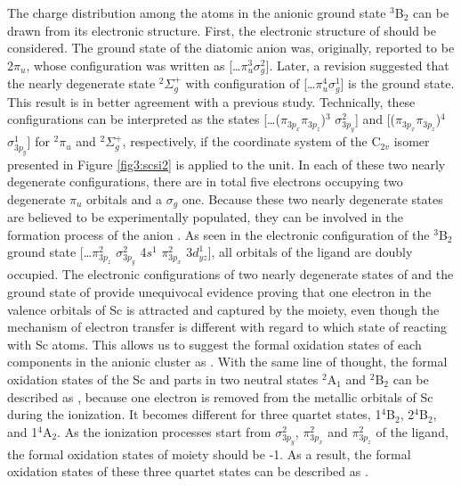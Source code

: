 \begin{refsection}
The charge distribution among the atoms in the anionic ground state $^3$B$_2$ can be drawn from its electronic structure. First, the electronic structure of  should be considered. The ground state of the diatomic anion  was, originally, reported to be 2$\pi_u$, whose configuration was written as [\ldots $\pi^3_u\sigma^2_g$].\cite{c3:47} Later, a revision suggested that the nearly degenerate state $^2\Sigma_g^+$ with configuration of [\ldots $\pi^4_u\sigma^1_g$] is the ground state.\cite{c3:48}  This result is in better agreement with a previous study.\cite{c3:49} Technically, these configurations can be interpreted as the states [\ldots ($\pi_{3p_x}\pi_{3p_z}$)$^3$ $\sigma^2_{3p_y}$] and [($\pi_{3p_x} \pi_{3p_z}$)$^4$ $\sigma^1_{3p_y}$] for $^2\pi_u$ and $^2\Sigma_g^+$, respectively, if the coordinate system of the C$_{2v}$ isomer presented in Figure \ref{fig3:scsi2} is applied to the  unit. In each of these two nearly degenerate configurations, there are in total five electrons occupying two degenerate $\pi_u$ orbitals and a $\sigma_g$ one. Because these two nearly degenerate states are believed to be experimentally populated,\cite{c3:48} they can be involved in the formation process of the anion . As seen in the electronic configuration of the $^3$B$_2$ ground state [\ldots $\pi^2_{3p_z}$ $\sigma^2_{3p_y}$ 4$s^1$ $\pi^2_{3p_x}$ 3$d_{yz}^1$], all orbitals of the  ligand are doubly occupied. The electronic configurations of two nearly degenerate states of  and the ground state of  provide unequivocal evidence proving that one electron in the valence orbitals of Sc is attracted and captured by the  moiety, even though the mechanism of electron transfer is different with regard to which state of  reacting with Sc atoms. This allows us to suggest the formal oxidation states of each components in the anionic cluster  as . With the same line of thought, the formal oxidation states of the Sc and   parts in two neutral states $^2$A$_1$ and $^2$B$_2$ can be described as , because one electron is removed from the metallic orbitals of Sc during the ionization. It becomes different for three quartet states, 1$^4$B$_2$, 2$^4$B$_2$, and 1$^4$A$_2$. As the ionization processes start from $\sigma^2_{3p_y}$, $\pi^2_{3p_x}$ and $\pi^2_{3p_z}$ of the ligand, the formal oxidation states of  moiety should be -1. As a result, the formal oxidation states of these three quartet states can be described as . 





\end{refsection}
